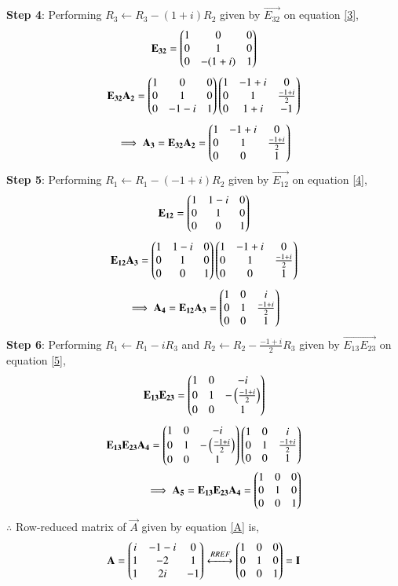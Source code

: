 \documentclass[journal,12pt,twocolumn]{IEEEtran}
\begin{document}
\textbf{Step 4}: Performing $R_3\leftarrow R_3-(1+i)R_2$ given by $\vec{E_{32}}$ on equation \eqref{3},
\begin{align}
\mathbf{E_{32}} = \begin{pmatrix}1&0&0\\0&1&0\\0&-(1+i)&1\end{pmatrix}
\end{align}
\begin{align}
\mathbf{E_{32}A_2} = \begin{pmatrix}1&0&0\\0&1&0\\0&-1-i&1\end{pmatrix}\begin{pmatrix}1&-1+i&0\\0&1&\frac{-1+i}{2}\\0&1+i&-1\end{pmatrix}
\end{align}
\begin{align}
\implies \mathbf{A_3}=\mathbf{E_{32}A_2} = \begin{pmatrix}1&-1+i&0\\0&1&\frac{-1+i}{2}\\0&0&1\end{pmatrix}\label{4}
\end{align}
\textbf{Step 5}: Performing $R_1\leftarrow R_1-(-1+i)R_2$ given by $\vec{E_{12}}$ on equation \eqref{4},
\begin{align}
\mathbf{E_{12}} = \begin{pmatrix}1&1-i&0\\0&1&0\\0&0&1\end{pmatrix}
\end{align}
\begin{align}
\mathbf{E_{12}A_3} = \begin{pmatrix}1&1-i&0\\0&1&0\\0&0&1\end{pmatrix}\begin{pmatrix}1&-1+i&0\\0&1&\frac{-1+i}{2}\\0&0&1\end{pmatrix}
\end{align}
\begin{align}
\implies \mathbf{A_4} = \mathbf{E_{12}A_3} = \begin{pmatrix}1&0&i\\0&1&\frac{-1+i}{2}\\0&0&1\end{pmatrix}\label{5}
\end{align}
\textbf{Step 6}: Performing $R_1\leftarrow R_1-iR_3$ and $R_2\leftarrow R_2-\frac{-1+i}{2}R_3$ given by $\vec{E_{13}E_{23}}$ on equation \eqref{5},
\begin{align}
\mathbf{E_{13}E_{23}} = \begin{pmatrix}1&0&-i\\0&1&-\left(\frac{-1+i}{2}\right)\\0&0&1\end{pmatrix}
\end{align}
\begin{align}
\mathbf{E_{13}E_{23}A_4} = \begin{pmatrix}1&0&-i\\0&1&-\left(\frac{-1+i}{2}\right)\\0&0&1\end{pmatrix}\begin{pmatrix}1&0&i\\0&1&\frac{-1+i}{2}\\0&0&1\end{pmatrix}\\
\implies \mathbf{A_5} = \mathbf{E_{13}E_{23}A_4} = \begin{pmatrix}1&0&0\\0&1&0\\0&0&1\end{pmatrix} 
\end{align}
$\therefore$ Row-reduced matrix of $\vec{A}$ given by equation \eqref{A} is,
\begin{align}
\mathbf{A} = \begin{pmatrix}i&-1-i&0\\1&-2&1\\1&2i&-1\end{pmatrix}\xleftrightarrow[]{RREF}\begin{pmatrix}1&0&0\\0&1&0\\0&0&1\end{pmatrix} = \mathbf{I}
\end{align}
\end{document}
